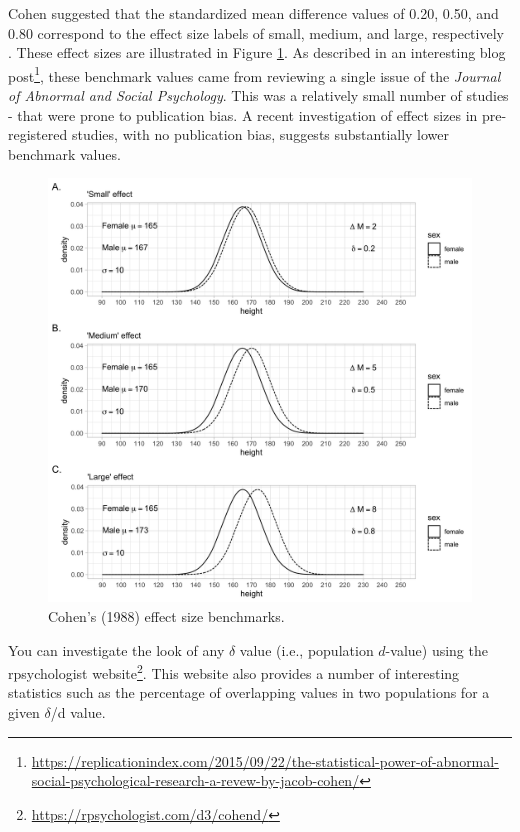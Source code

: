 \documentclass[
]{krantz}
\renewcommand{\href}[2]{#2\footnote{\url{#1}}}
\begin{document}
Cohen suggested that the standardized mean difference values of 0.20, 0.50, and 0.80 correspond to the effect size labels of small, medium, and large, respectively \citep{cohen1988}. These effect sizes are illustrated in Figure \ref{fig:dex4}. As described in an interesting \href{https://replicationindex.com/2015/09/22/the-statistical-power-of-abnormal-social-psychological-research-a-revew-by-jacob-cohen/}{blog post}, these benchmark values came from reviewing a single issue of the \emph{Journal of Abnormal and Social Psychology}. This was a relatively small number of studies - that were prone to publication bias. A recent investigation \citep[see][]{schafer2019meaningfulness} of effect sizes in pre-registered studies, with no publication bias, suggests substantially lower benchmark values.

\begin{figure}
\includegraphics[width=1\linewidth]{ch_populations/images/dvalue_ex4} \caption{Cohen's (1988) effect size benchmarks.}\label{fig:dex4}
\end{figure}

You can investigate the look of any \(\delta\) value (i.e., population \(d\)-value) using the rpsychologist \href{https://rpsychologist.com/d3/cohend/}{website}. This website also provides a number of interesting statistics such as the percentage of overlapping values in two populations for a given \(\delta\)/d value.
\end{document}
